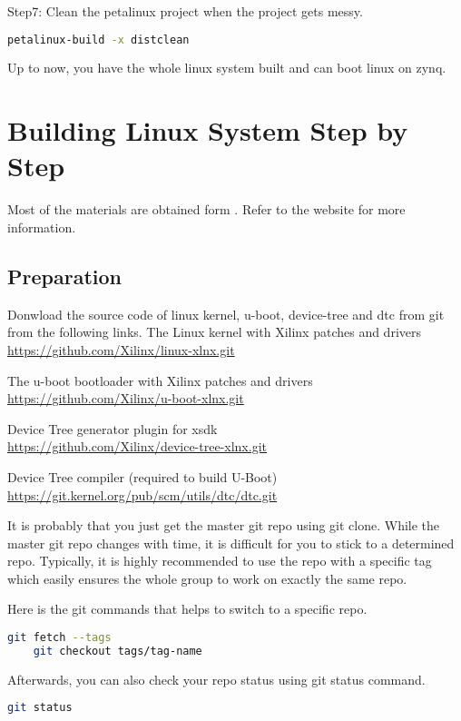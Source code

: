 \documentclass[12pt]{article} %
\begin{document}
Step7: Clean the petalinux project when the project gets messy.
\begin{lstlisting}[language=bash]
    petalinux-build -x distclean
\end{lstlisting}

Up to now, you have the whole linux system built and can boot linux on zynq.

\section{Building Linux System Step by Step}
Most of the materials are obtained form \cite{xilinx-linux-wiki}. Refer to the website for more information.

\subsection{Preparation} 
Donwload the source code of linux kernel, u-boot, device-tree and dtc from git from the following links.
The Linux kernel with Xilinx patches and drivers \\
\url{https://github.com/Xilinx/linux-xlnx.git}

The u-boot bootloader with Xilinx patches and drivers \\
\url{https://github.com/Xilinx/u-boot-xlnx.git}

Device Tree generator plugin for xsdk \\
\url{https://github.com/Xilinx/device-tree-xlnx.git}

Device Tree compiler (required to build U-Boot) \\
\url{https://git.kernel.org/pub/scm/utils/dtc/dtc.git}

It is probably that you just get the master git repo using git clone. While the master git repo changes 
with time, it is difficult for you to stick to a determined repo. Typically, it is highly recommended to use the 
repo with a specific tag which easily ensures the whole group to work on exactly the same repo.

Here is the git commands that helps to switch to a specific repo.
\begin{lstlisting}[language=bash]
    git fetch --tags
    git checkout tags/tag-name
\end{lstlisting}

Afterwards, you can also check your repo status using git status command.
\begin{lstlisting}[language=bash]
    git status
\end{lstlisting}
\end{document}
